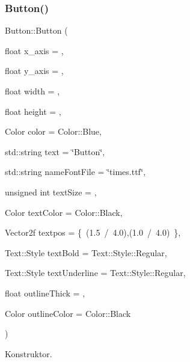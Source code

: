 \subsubsection{\texorpdfstring{Button()}{Button()}}
{\footnotesize\ttfamily Button\+::\+Button (\begin{DoxyParamCaption}\item[{float}]{x\+\_\+axis = {},  }\item[{float}]{y\+\_\+axis = {},  }\item[{float}]{width = {},  }\item[{float}]{height = {},  }\item[{Color}]{color = {\ttfamily Color\+:\+:Blue},  }\item[{std\+::string}]{text = {\ttfamily \char`\"{}Button\char`\"{}},  }\item[{std\+::string}]{name\+Font\+File = {\ttfamily \char`\"{}times.ttf\char`\"{}},  }\item[{unsigned int}]{text\+Size = {},  }\item[{Color}]{text\+Color = {\ttfamily Color\+:\+:Black},  }\item[{Vector2f}]{textpos = {\ttfamily \{~(1.5~/~4.0),(1.0~/~4.0)~\}},  }\item[{Text\+::\+Style}]{text\+Bold = {\ttfamily Text\+:\+:Style\+:\+:Regular},  }\item[{Text\+::\+Style}]{text\+Underline = {\ttfamily Text\+:\+:Style\+:\+:Regular},  }\item[{float}]{outline\+Thick = {},  }\item[{Color}]{outline\+Color = {\ttfamily Color\+:\+:Black} }\end{DoxyParamCaption})}



Konstruktor. 


